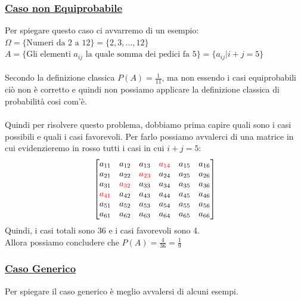 \documentclass{article}
\begin{document}
\subsubsection{\underline{Caso non Equiprobabile}}
Per spiegare questo caso ci avvarremo di un esempio: \\
$\Omega = \{\text{Numeri da 2 a 12}\} = \{2, 3, \dots, 12 \} $ \\
$A = \{\text{Gli elementi } a_{ij}\text{ la quale somma dei pedici fa } 5\} = \{ a_{ij} \big| i+j = 5\}$ \\ \\
Secondo la definizione classica $P(A) = \frac{1}{11}$, ma non essendo i casi equiprobabili ciò non è corretto e quindi non possiamo applicare la definizione classica di probabilità cosi com’è. \\ \\
Quindi per risolvere questo problema, dobbiamo prima capire quali sono i casi possibili e quali i casi favorevoli.
Per farlo possiamo avvalerci di una matrice in cui evidenzieremo in rosso tutti i casi in cui $i+j = 5$: 
\[\begin{bmatrix}
a_{11} & a_{12} & a_{13} & \color{red}a_{14} & a_{15} & a_{16} \\
a_{21} & a_{22} & \color{red}a_{23} & a_{24} & a_{25} & a_{26} \\
a_{31} & \color{red}a_{32} & a_{33} & a_{34} & a_{35} & a_{36} \\
\color{red}a_{41} & a_{42} & a_{43} & a_{44} & a_{45} & a_{46} \\
a_{51} & a_{52} & a_{53} & a_{54} & a_{55} & a_{56} \\
a_{61} & a_{62} & a_{63} & a_{64} & a_{65} & a_{66} \\
\end{bmatrix}\]
Quindi, i casi totali sono 36 e i casi favorevoli sono 4. \\
Allora possiamo concludere che $P(A) = \frac{4}{36} = \frac{1}{9}$

\subsubsection{\underline{Caso Generico}}
Per spiegare il caso generico è meglio avvalersi di alcuni esempi.
\end{document}

